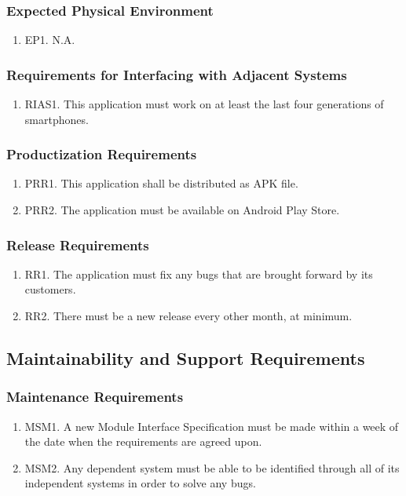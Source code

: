 \documentclass[]{article}
\begin{document}
\subsubsection{Expected Physical Environment}
\begin{enumerate}
	\item EP1. N.A.
\end{enumerate}

\subsubsection{Requirements for Interfacing with Adjacent Systems}
\begin{enumerate}
	\item RIAS1. This application must work on at least the last four generations of smartphones.
\end{enumerate}

\subsubsection{Productization Requirements}
\begin{enumerate}
	\item PRR1. This application shall be distributed as APK file.
	\item PRR2. The application must be available on Android Play Store.
\end{enumerate}

\subsubsection{Release Requirements}
\begin{enumerate}
	\item RR1. The application must fix any bugs that are brought forward by its customers.
	\item RR2. There must be a new release every other month, at minimum.
\end{enumerate}

\subsection{Maintainability and Support Requirements}
\subsubsection{Maintenance Requirements}
\begin{enumerate}
	\item MSM1. A new Module Interface Specification must be made within a week of the date when the requirements are agreed upon.
	\item MSM2. Any dependent system must be able to be identified through all of its independent systems in order to solve any bugs.
\end{enumerate}
\end{document}
